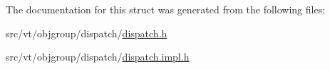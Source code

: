 The documentation for this struct was generated from the following files\+:\begin{DoxyCompactItemize}
\item 
src/vt/objgroup/dispatch/\hyperlink{src_2vt_2objgroup_2dispatch_2dispatch_8h}{dispatch.\+h}\item 
src/vt/objgroup/dispatch/\hyperlink{src_2vt_2objgroup_2dispatch_2dispatch_8impl_8h}{dispatch.\+impl.\+h}\end{DoxyCompactItemize}
